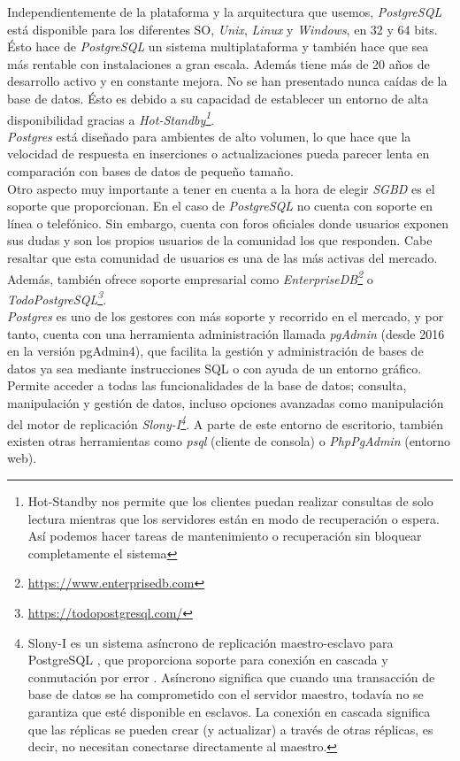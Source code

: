 \documentclass[11pt,a4paper]{article}
\begin{document}
Independientemente de la plataforma y la arquitectura que usemos, \emph{PostgreSQL} está disponible para los diferentes SO, \emph{Unix}, \emph{Linux} y \emph{Windows}, en 32 y 64 bits. Ésto hace de \emph{PostgreSQL} un sistema multiplataforma y también hace que sea más rentable con instalaciones a gran escala. Además tiene más de 20 años de desarrollo activo y en constante mejora. No se han presentado nunca caídas de la base de datos. Ésto es debido a su capacidad de establecer un entorno de alta disponibilidad gracias a \emph{Hot-Standby\footnote{Hot-Standby nos permite que los clientes puedan realizar consultas de solo lectura mientras que los servidores están en modo de recuperación o espera. Así podemos hacer tareas de mantenimiento o recuperación sin bloquear completamente el sistema\cite{TODOPOST:2}}}. \cite{TODOPOST:1} \\

\emph{Postgres} está diseñado para ambientes de alto volumen, lo que hace que la velocidad de respuesta en inserciones o actualizaciones pueda parecer lenta en comparación con bases de datos de pequeño tamaño.\cite{TODOPOST:3}\\

Otro aspecto muy importante a tener en cuenta a la hora de elegir \emph{SGBD} es el soporte que proporcionan. En el caso de \emph{PostgreSQL} no cuenta con soporte en línea o telefónico. Sin embargo, cuenta con foros oficiales donde usuarios exponen sus dudas y son los propios usuarios de la comunidad los que responden. Cabe resaltar que esta comunidad de usuarios es una de las más activas del mercado. Además, también ofrece soporte empresarial como \emph{EnterpriseDB\footnote{\url{https://www.enterprisedb.com}}} o \emph{TodoPostgreSQL\footnote{\url{https://todopostgresql.com/}}}.\cite{TODOPOST:3} \\

\emph{Postgres} es uno de los gestores con más soporte y recorrido en el mercado, y por tanto, cuenta con una herramienta administración llamada \emph{pgAdmin} (desde 2016 en la versión pgAdmin4), que facilita la gestión y administración de bases de datos ya sea mediante instrucciones SQL o con ayuda de un entorno gráfico. Permite acceder a todas las funcionalidades de la base de datos; consulta, manipulación y gestión de datos, incluso opciones avanzadas como manipulación del motor de replicación \emph{Slony-I\footnote {Slony-I es un sistema asíncrono de replicación maestro-esclavo para PostgreSQL , que proporciona soporte para conexión en cascada y conmutación por error . Asíncrono significa que cuando una transacción de base de datos se ha comprometido con el servidor maestro, todavía no se garantiza que esté disponible en esclavos. La conexión en cascada significa que las réplicas se pueden crear (y actualizar) a través de otras réplicas, es decir, no necesitan conectarse directamente al maestro.\cite{SLO:1}}}. A parte de este entorno de escritorio, también existen otras herramientas como \emph{psql} (cliente de consola) o \emph{PhpPgAdmin} (entorno web).\cite{PG:1}
\end{document}
